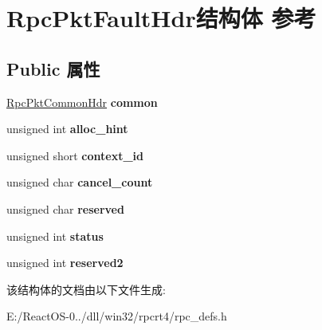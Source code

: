 \hypertarget{struct_rpc_pkt_fault_hdr}{}\section{Rpc\+Pkt\+Fault\+Hdr结构体 参考}
\label{struct_rpc_pkt_fault_hdr}
\subsection*{Public 属性}
\begin{DoxyCompactItemize}
\item 
\mbox{\label{struct_rpc_pkt_fault_hdr_ae0133a1f15164f5b5421c294df429a9c}} 
\hyperlink{struct_rpc_pkt_common_hdr}{Rpc\+Pkt\+Common\+Hdr} {\bfseries common}
\item 
\mbox{\label{struct_rpc_pkt_fault_hdr_ada375351be963bc6c359ae525daf1b5b}} 
unsigned int {\bfseries alloc\+\_\+hint}
\item 
\mbox{\label{struct_rpc_pkt_fault_hdr_a867bfba136ba8477a87cfe43199f0d79}} 
unsigned short {\bfseries context\+\_\+id}
\item 
\mbox{\label{struct_rpc_pkt_fault_hdr_ab515e40b6b29424af573f4d1ec939953}} 
unsigned char {\bfseries cancel\+\_\+count}
\item 
\mbox{\label{struct_rpc_pkt_fault_hdr_a3e093b8ca7f134693afbe47481ea2ae3}} 
unsigned char {\bfseries reserved}
\item 
\mbox{\label{struct_rpc_pkt_fault_hdr_aaddcfedd74015c11c7d00d2a7af70ba2}} 
unsigned int {\bfseries status}
\item 
\mbox{\label{struct_rpc_pkt_fault_hdr_ad55b10fab3cd692294584a96d42fe2e8}} 
unsigned int {\bfseries reserved2}
\end{DoxyCompactItemize}


该结构体的文档由以下文件生成\+:\begin{DoxyCompactItemize}
\item 
E\+:/\+React\+O\+S-\/0../dll/win32/rpcrt4/rpc\+\_\+defs.\+h\end{DoxyCompactItemize}
